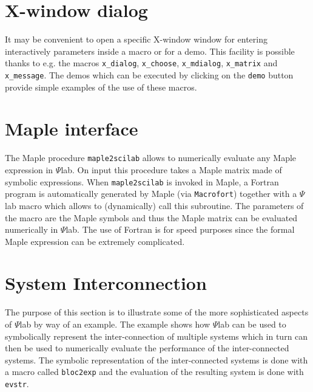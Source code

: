 \section{X-window dialog}
It may be convenient to open a specific X-window window for entering
interactively parameters inside a macro or for a demo.
This facility is possible thanks to e.g. the macros \verb!x_dialog!,
\verb!x_choose!, \verb!x_mdialog!, \verb!x_matrix! and \verb!x_message!.
The demos which can be executed by clicking on the {\tt demo} button
provide simple examples of the use of these macros.

\section{Maple interface}
The Maple procedure {\tt maple2scilab} allows to numerically evaluate
any Maple expression in $\Psi$lab.
On input this procedure takes a Maple matrix made of symbolic
expressions. When {\tt maple2scilab} is invoked in Maple,
a Fortran program is automatically generated by Maple 
(via {\tt Macrofort}) together with a $\Psi$lab macro which 
allows to (dynamically) call this subroutine.
The parameters of the macro are the Maple symbols and thus the Maple
matrix can be evaluated numerically in $\Psi$lab. The use of Fortran
is for speed purposes since the formal Maple expression can be
extremely complicated.

\section{System Interconnection}
	The purpose of this section is to illustrate some
of the more sophisticated aspects of $\Psi$lab by way of an example.
The example shows how $\Psi$lab can be used to symbolically represent
the inter-connection of multiple systems which in turn can 
then be used to numerically evaluate the performance of the
inter-connected systems.  The symbolic representation of the
inter-connected systems is done with a macro called {\tt bloc2exp}
and the evaluation of the resulting system is done with
{\tt evstr}.

